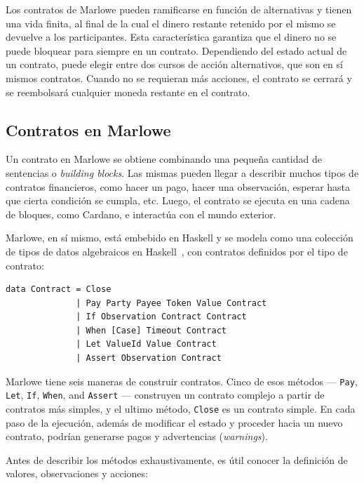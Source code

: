 \documentclass[12pt]{book}
\begin{document}
Los contratos de Marlowe pueden ramificarse en función de alternativas y tienen una vida finita, al final de la cual el dinero restante retenido por el mismo se devuelve a los participantes. Esta característica garantiza que el dinero no se puede bloquear para siempre en un contrato. Dependiendo del estado actual de un contrato, puede elegir entre dos cursos de acción alternativos, que son en sí mismos contratos. Cuando no se requieran más acciones, el contrato se cerrará y se reembolsará cualquier moneda restante en el contrato.

\subsection{Contratos en Marlowe}
Un contrato en Marlowe se obtiene combinando una pequeña cantidad de sentencias o \textit{building blocks}. Las mismas pueden llegar a describir muchos tipos de contratos financieros, como hacer un pago, hacer una observación, esperar hasta que cierta condición se cumpla, etc. Luego, el contrato se ejecuta en una cadena de bloques, como Cardano, e interactúa con el mundo exterior.

Marlowe, en sí mismo, está embebido en Haskell y se modela como una colección de tipos de datos algebraicos en Haskell~\cite{Algebraic_data_type}, con contratos definidos por el tipo de contrato:

\begin{lstlisting}[language=Marlowe]
data Contract = Close
              | Pay Party Payee Token Value Contract
              | If Observation Contract Contract
              | When [Case] Timeout Contract
              | Let ValueId Value Contract
              | Assert Observation Contract
\end{lstlisting}

Marlowe tiene seis maneras de construir contratos. Cinco de esos métodos ---
\texttt{Pay}, \texttt{Let}, \texttt{If}, \texttt{When}, and \texttt{Assert} --- construyen un contrato complejo a partir de contratos más simples, y el ultimo método, \texttt{Close} es un contrato simple. En cada paso de la ejecución, además de modificar el estado y proceder hacia un nuevo contrato, podrían generarse pagos y advertencias (\textit{warnings}).

Antes de describir los métodos exhaustivamente, es útil conocer la definición de valores, observaciones y acciones:
\end{document}
